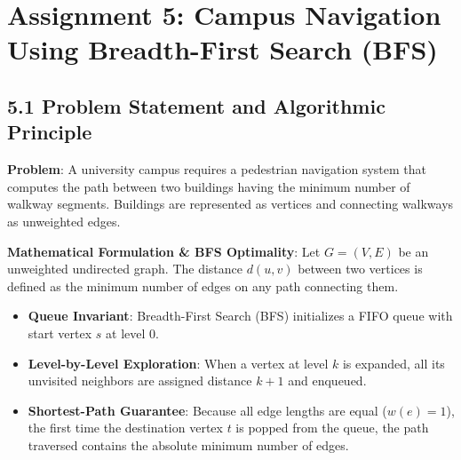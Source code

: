 \documentclass[12pt]{article}
\begin{document}
\newpage

\section*{Assignment 5: Campus Navigation Using Breadth-First Search (BFS)}

\subsection*{5.1 Problem Statement and Algorithmic Principle}
\textbf{Problem}: A university campus requires a pedestrian navigation system that computes the path between two buildings having the minimum number of walkway segments. Buildings are represented as vertices and connecting walkways as unweighted edges.

\textbf{Mathematical Formulation \& BFS Optimality}:
Let $G = (V, E)$ be an unweighted undirected graph. The distance $d(u, v)$ between two vertices is defined as the minimum number of edges on any path connecting them.
\begin{itemize}
    \item \textbf{Queue Invariant}: Breadth-First Search (BFS) initializes a FIFO queue with start vertex $s$ at level $0$.
    \item \textbf{Level-by-Level Exploration}: When a vertex at level $k$ is expanded, all its unvisited neighbors are assigned distance $k + 1$ and enqueued.
    \item \textbf{Shortest-Path Guarantee}: Because all edge lengths are equal ($w(e) = 1$), the first time the destination vertex $t$ is popped from the queue, the path traversed contains the absolute minimum number of edges.
\end{itemize}
\end{document}
